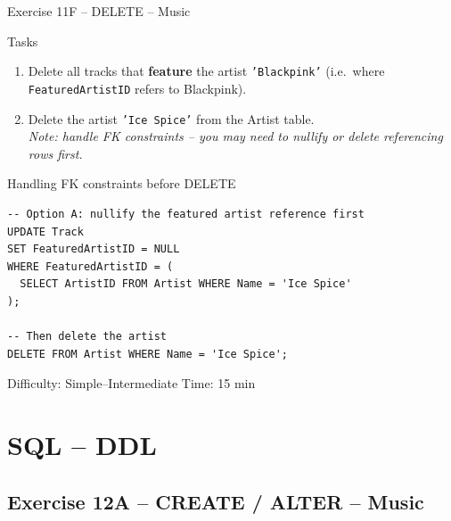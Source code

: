 \documentclass[10pt]{beamer}
\begin{document}
\begin{frame}[fragile]{Exercise 11F -- DELETE -- Music}
  \begin{block}{Tasks}
    \begin{enumerate}
      \item Delete all tracks that \textbf{feature} the artist \texttt{'Blackpink'} (i.e.\ where \texttt{FeaturedArtistID} refers to Blackpink).
      \item Delete the artist \texttt{'Ice Spice'} from the Artist table.\\
            \textit{Note: handle FK constraints -- you may need to nullify or delete referencing rows first.}
    \end{enumerate}
  \end{block}

  \begin{block}{Handling FK constraints before DELETE}
\begin{lstlisting}[style=sqlstyle]
-- Option A: nullify the featured artist reference first
UPDATE Track
SET FeaturedArtistID = NULL
WHERE FeaturedArtistID = (
  SELECT ArtistID FROM Artist WHERE Name = 'Ice Spice'
);

-- Then delete the artist
DELETE FROM Artist WHERE Name = 'Ice Spice';
\end{lstlisting}
  \end{block}

  \begin{alertblock}{Difficulty: Simple--Intermediate \quad Time: 15 min}
  \end{alertblock}
\end{frame}

\section{SQL -- DDL}

\subsection{Exercise 12A -- CREATE / ALTER -- Music}
\end{document}
